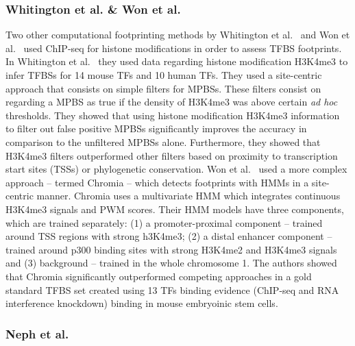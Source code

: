 \subsubsection{Whitington et al. \& Won et al.}
\label{sec:whitington.hon.2}

Two other computational footprinting methods by Whitington et al.~\cite{whitington2009} and Won et al.~\cite{won2010} used ChIP-seq for histone modifications in order to assess TFBS footprints. In Whitington et al.~\cite{whitington2009} they used data regarding histone modification H3K4me3 to infer TFBSs for 14 mouse TFs and 10 human TFs. They used a site-centric approach that consists on simple filters for MPBSs. These filters consist on regarding a MPBS as true if the density of H3K4me3 was above certain \emph{ad hoc} thresholds. They showed that using histone modification H3K4me3 information to filter out false positive MPBSs significantly improves the accuracy in comparison to the unfiltered MPBSs alone. Furthermore, they showed that H3K4me3 filters outperformed other filters based on proximity to transcription start sites (TSSs) or phylogenetic conservation. Won et al.~\cite{won2010} used a more complex approach -- termed Chromia -- which detects footprints with HMMs in a site-centric manner. Chromia uses a multivariate HMM which integrates continuous H3K4me3 signals and PWM scores. Their HMM models have three components, which are trained separately: (1) a promoter-proximal component -- trained around TSS regions with strong h3K4me3; (2) a distal enhancer component -- trained around p300 binding sites with strong H3K4me2 and H3K4me3 signals and (3) background -- trained in the whole chromosome 1. The authors showed that Chromia significantly outperformed competing approaches in a gold standard TFBS set created using 13 TFs binding evidence (ChIP-seq and RNA interference knockdown) binding in mouse embryoinic stem cells.

\subsubsection{Neph et al.}
\label{sec:neph.2}

